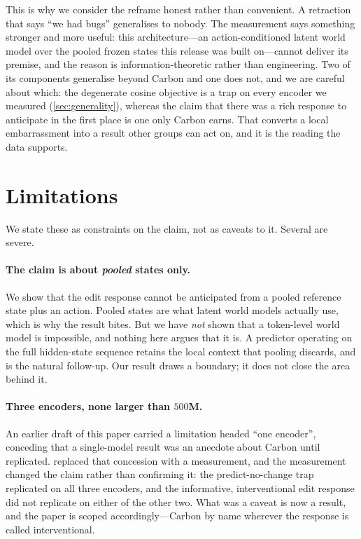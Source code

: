\documentclass{article}
\begin{document}
This is why we consider the reframe honest rather than convenient. A retraction that says ``we had
bugs'' generalises to nobody. The measurement says something stronger and more useful: this
architecture---an action-conditioned latent world model over the pooled frozen states this release
was built on---cannot deliver its premise, and the reason is information-theoretic rather than
engineering. Two of its components generalise beyond Carbon and one does not, and we are careful
about which: the degenerate cosine objective is a trap on every encoder we measured
(\cref{sec:generality}), whereas the claim that there was a rich response to anticipate in the first
place is one only Carbon earns. That converts a local embarrassment into a result other groups can
act on, and it is the reading the data supports.

\tabVEP
\tabRollout

\section{Limitations}
\label{sec:limitations}

We state these as constraints on the claim, not as caveats to it. Several are severe.

\paragraph{The claim is about \emph{pooled} states only.} We show that the edit response cannot be
anticipated from a pooled reference state plus an action. Pooled states are what latent world models
actually use, which is why the result bites. But we have \emph{not} shown that a token-level world
model is impossible, and nothing here argues that it is. A predictor operating on the full
hidden-state sequence retains the local context that pooling discards, and is the natural follow-up.
Our result draws a boundary; it does not close the area behind it.

\paragraph{Three encoders, none larger than $500$M.} An earlier draft of this paper carried a
limitation headed ``one encoder'', conceding that a single-model result was an anecdote about Carbon
until replicated.  replaced that concession with a measurement, and the
measurement changed the claim rather than confirming it: the predict-no-change trap replicated on
all three encoders, and the informative, interventional edit response did not replicate on either of
the other two. What was a caveat is now a result, and the paper is scoped accordingly---Carbon by
name wherever the response is called interventional.
\end{document}
